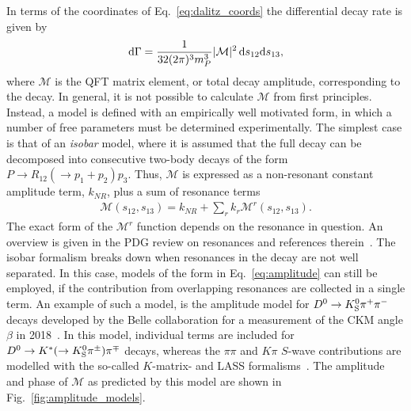 In terms of the coordinates of Eq.~\eqref{eq:dalitz_coords} the differential decay rate is given by
\begin{align}
    \text d \Gamma = \frac{1}{32(2\pi)^3 m^3_P} |\mathcal M|^2 \,\text d s_{12} \text d s_{13},
\end{align}
where $\mathcal M$ is the QFT matrix element, or total decay amplitude, corresponding to the decay. In general, it is not possible to calculate $\mathcal M$ from first principles. Instead, a model is defined with an empirically well motivated form, in which a number of free parameters must be determined experimentally. The simplest case is that of an \emph{isobar} model, where it is assumed that the full decay can be decomposed into consecutive two-body decays of the form $P \to R_{12} (\to p_1 + p_2) p_3$. Thus, $\mathcal M$ is expressed as a non-resonant constant amplitude term, $k_{NR}$, plus a sum of resonance terms
\begin{align}\label{eq:amplitude}
    \mathcal M (s_{12}, s_{13}) = k_{NR} + \sum_r k_r \mathcal M^r(s_{12}, s_{13}).
\end{align}
The exact form of the $\mathcal M^r$ function depends on the resonance in question. An overview is given in the PDG review on resonances and references therein~\cite{PDG2020}. The isobar formalism breaks down when resonances in the decay are not well separated. In this case, models of the form in Eq.~\eqref{eq:amplitude} can still be employed, if the contribution from overlapping resonances are collected in a single term. An example of such a model, is the amplitude model for ${{D}^0}\rightarrow{\ensuremath{{K}^0_{\mathrm{S}}}}{\ensuremath{{\pi}^+}}{\ensuremath{{\pi}^-}}$ decays developed by the Belle collaboration for a measurement of the CKM angle $\beta$ in 2018~\cite{Belle2018}. In this model, individual terms are included for ${{D}^0}\rightarrow{\ensuremath{{K}^*}}(\rightarrow{\ensuremath{{K}^0_{\mathrm{S}}}}\pi^\pm){{\pi}^\mp}$ decays, whereas the $\pi\pi$ and $K\pi$  $S$-wave contributions are modelled with the so-called $K$-matrix- and LASS formalisms~\cite{chungPartialWaveAnalysis1995,astonStudyPiScattering1988}. The amplitude and phase of $\mathcal M$ as predicted by this model are shown in Fig.~\ref{fig:amplitude_models}.

